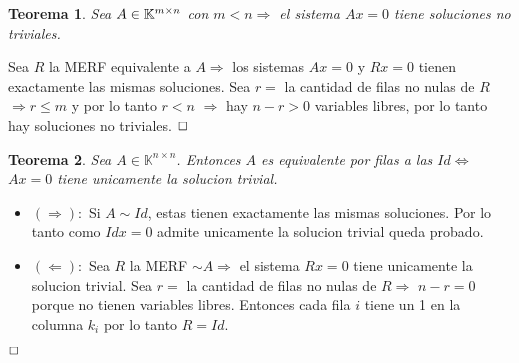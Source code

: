 \documentclass[]{article}
\newtheorem{theorem}{Teorema}
\newenvironment{proof}{\noindent{\bf Prueba:}}{$\hfill \Box$ \vspace{10pt}}
\begin{document}
\begin{theorem}
    Sea $A \in \text{$\mathbb{K}^{m \times n}$}$ con $m<n \Longrightarrow$ el sistema $Ax=0$
    tiene soluciones no triviales.
\end{theorem}
\begin{proof}
    Sea $R$ la MERF equivalente a $A \Longrightarrow$ los sistemas $Ax=0$ y $Rx=0$ tienen
    exactamente las mismas soluciones. Sea $r=$ la cantidad de filas no nulas de $R$
    $\Longrightarrow r \leq m$ y por lo tanto $r < n$ $\Longrightarrow$ hay $n-r>0$
    variables libres, por lo tanto hay soluciones no triviales.
\end{proof}

\begin{theorem}
    Sea $A \in \mathbb{K}^{n \times n}$. Entonces $A$ es equivalente por filas a las $Id \iff$
    $Ax=0$ tiene unicamente la solucion trivial.
\end{theorem}
\begin{proof}
    \begin{itemize}
        \item $(\Longrightarrow):$ Si $A \sim Id$, estas tienen exactamente las mismas soluciones.
        Por lo tanto como $Idx=0$ admite unicamente la solucion trivial queda probado.
        \item $(\Longleftarrow):$ Sea $R$ la MERF $\sim A \Longrightarrow$ el sistema $Rx=0$
        tiene unicamente la solucion trivial. Sea $r=$ la cantidad de filas no nulas de $R \Longrightarrow$
        $n-r=0$ porque no tienen variables libres. Entonces cada fila $i$ tiene un 1 en la columna $k_i$
        por lo tanto $R=Id$.
    \end{itemize}
\end{proof}
\end{document}
